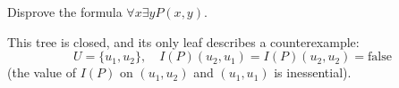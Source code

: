 

\setcounter{section}{2}
\setcounter{subsection}{3}
\setcounter{dfn}{10}

\begin{exl}
\label{exl:CounterexampleFinite}
Disprove the formula $\forall x \exists y P(x,y)$.
\begin{prooftree}
\end{prooftree}

This tree is closed, and its only leaf describes a counterexample:
\[
U = \{u_1, u_2\}, \quad I(P)(u_2,u_1) = I(P)(u_2,u_2) = \text{false}
\]
(the value of $I(P)$ on $(u_1, u_2)$ and $(u_1, u_1)$ is inessential).
\end{exl}

